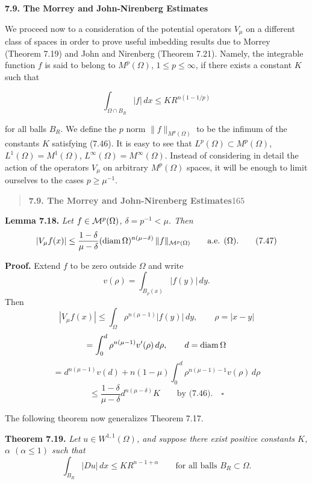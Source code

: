 \noindent\textbf{7.9. The Morrey and John-Nirenberg Estimates}\label{gt:sec-morrey-john-nirenberg}

We proceed now to a consideration of the potential operators $V_{\mu}$ on a different class of spaces in order to prove useful imbedding results due to Morrey (Theorem 7.19) and John and Nirenberg (Theorem 7.21). Namely, the integrable function $f$ is said to belong to $M^p(\Omega)$, $1\le p\le \infty$, if there exists a constant $K$ such that

\begin{equation}
\tag{7.46}
\int_{\Omega\cap B_R} |f|\,dx\le KR^{n(1-1/p)}
\end{equation}

for all balls $B_R$. We define the $p$ norm $\|f\|_{M^p(\Omega)}$ to be the infimum of the constants $K$ satisfying (7.46). It is easy to see that $L^p(\Omega)\subset M^p(\Omega)$, $L^1(\Omega)=M^1(\Omega)$, $L^{\infty}(\Omega)=M^{\infty}(\Omega)$. Instead of considering in detail the action of the operators $V_{\mu}$ on arbitrary $M^p(\Omega)$ spaces, it will be enough to limit ourselves to the cases $p\ge \mu^{-1}$.



\begin{quote}
\textbf{7.9. The Morrey and John-Nirenberg Estimates}\hfill 165
\end{quote}

\textbf{Lemma 7.18.} \emph{Let $f \in \mathcal{M}^p(\Omega)$, $\delta = p^{-1} < \mu$. Then}
\begin{equation}
|V_{\mu} f(x)| \le \frac{1-\delta}{\mu-\delta} (\operatorname{diam} \Omega)^{n(\mu-\delta)} \, \|f\|_{\mathcal{M}^p(\Omega)}
\qquad \text{a.e. }(\Omega).
\tag{7.47}
\end{equation}

\textbf{Proof.} Extend $f$ to be zero outside $\Omega$ and write
\[
v(\rho)=\int_{B_{\rho}(x)} |f(y)| \, dy.
\]
Then
\[
|V_{\mu} f(x)| \le \int_{\Omega} \rho^{n(\mu-1)} |f(y)| \, dy, \qquad \rho = |x-y|
\]
\[
= \int_{0}^{d} \rho^{n(\mu-1)} v'(\rho) \, d\rho, \qquad d = \operatorname{diam} \Omega
\]
\[
= d^{n(\mu-1)}v(d) + n(1-\mu)\int_{0}^{d} \rho^{n(\mu-1)-1} v(\rho)\, d\rho
\]
\[
\le \frac{1-\delta}{\mu-\delta} d^{n(\mu-\delta)} K \qquad \text{by (7.46).}\quad \square
\]

The following theorem now generalizes Theorem 7.17.

\textbf{Theorem 7.19.} \emph{Let $u \in W^{1,1}(\Omega)$, and suppose there exist positive constants $K$,
$\alpha$ $(\alpha \le 1)$ such that}
\begin{equation}
\int_{B_R} |Du| \, dx \le K R^{n-1+\alpha} \qquad \text{for all balls } B_R \subset \Omega.
\tag{7.48}
\end{equation}

